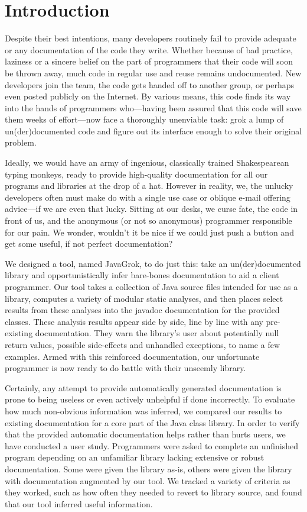 \section{Introduction}

Despite their best intentions, many developers routinely fail to provide
adequate or any documentation of the code they write.  Whether because of bad
practice, laziness or a sincere belief on the part of programmers that their
code will soon be thrown away, much code in regular use and reuse remains
undocumented.  New developers join the team, the code gets handed off to
another group, or perhaps even posted publicly on the Internet.  By various
means, this code finds its way into the hands of programmers who---having been
assured that this code will save them weeks of effort---now face a thoroughly
unenviable task: grok a lump of un(der)documented code and figure out its
interface enough to solve their original problem.

Ideally, we would have an army of ingenious, classically trained Shakespearean
typing monkeys, ready to provide high-quality documentation for all our
programs and libraries at the drop of a hat.  However in reality, we, the
unlucky developers often must make do with a single use case or oblique e-mail
offering advice---if we are even that lucky.  Sitting at our desks, we curse
fate, the code in front of us, and the anonymous (or not so anonymous)
programmer responsible for our pain.  We wonder, wouldn't it be nice if we
could just push a button and get some useful, if not perfect documentation?

We designed a tool, named JavaGrok, to do just this: take an un(der)documented
library and opportunistically infer bare-bones documentation to aid a client
programmer.  Our tool takes a collection of Java source files intended for use
as a library, computes a variety of modular static analyses, and then places
select results from these analyses into the javadoc documentation for the
provided classes.  These analysis results appear side by side, line by line
with any pre-existing documentation.  They warn the library's user about
potentially null return values, possible side-effects and unhandled exceptions,
to name a few examples.  Armed with this reinforced documentation, our
unfortunate programmer is now ready to do battle with their unseemly library.

Certainly, any attempt to provide automatically generated documentation is
prone to being useless or even actively unhelpful if done incorrectly.
To evaluate
how much non-obvious information was inferred, we compared our results to
existing documentation for a core part of the Java class library.  In order to
verify that the provided automatic documentation helps rather than hurts users,
we have conducted a user study.  Programmers were asked to complete an
unfinished program depending on an unfamiliar library lacking extensive or
robust documentation.  Some were given the library as-is, others were given the
library with documentation augmented by our tool.  We tracked a variety of criteria as they worked, such as
how often they needed to revert to library source, and found that our tool
inferred useful information.
